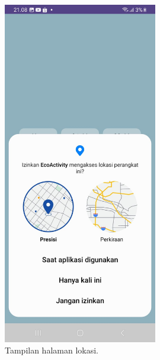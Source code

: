 \documentclass[journal,article,submit,pdftex,moreauthors]{Definitions/mdpi}
\begin{document}
\begin{figure}[H]
    \centering
    \includegraphics[width=0.6\textwidth]{Definitions/images/02.jpeg}
    \caption{Tampilan halaman lokasi.}
    \label{fig:user-profile}
\end{figure}
\end{document}
